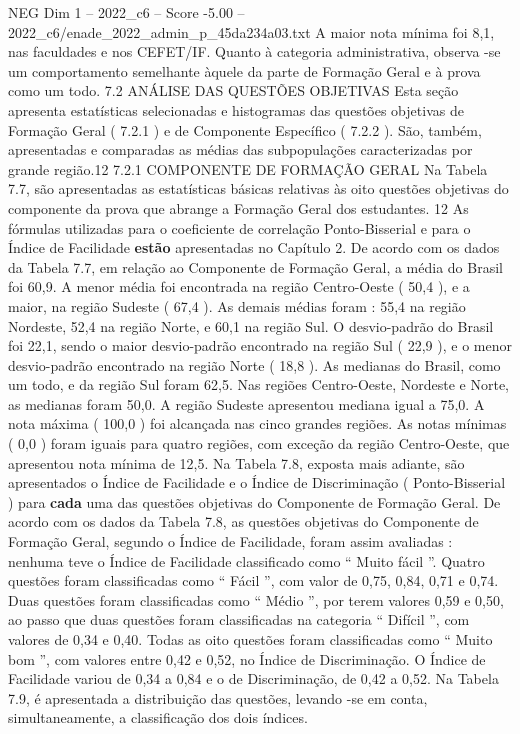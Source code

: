\begin{textsample}{NEG Dim 1 – 2022\_c6 – Score -5.00 – 2022\_c6/enade\_2022\_admin\_p\_45da234a03.txt}
A maior nota mínima foi 8,1, nas faculdades e nos CEFET/IF.
Quanto à categoria administrativa, observa -se um comportamento semelhante àquele da parte de Formação Geral e à prova como um todo. 7.2 ANÁLISE DAS QUESTÕES OBJETIVAS Esta seção apresenta estatísticas selecionadas e histogramas das questões objetivas de Formação Geral ( 7.2.1 ) e de Componente Específico ( 7.2.2 ).
São, também, apresentadas e comparadas as médias das subpopulações caracterizadas por grande região.12 7.2.1 COMPONENTE DE FORMAÇÃO GERAL Na Tabela 7.7, são apresentadas as estatísticas básicas relativas às oito questões objetivas do componente da prova que abrange a Formação Geral dos estudantes. 12 As fórmulas utilizadas para o coeficiente de correlação Ponto-Bisserial e para o Índice de Facilidade \textbf{estão} apresentadas no Capítulo 2.
De acordo com os dados da Tabela 7.7, em relação ao Componente de Formação Geral, a média do Brasil foi 60,9.
A menor média foi encontrada na região Centro-Oeste ( 50,4 ), e a maior, na região Sudeste ( 67,4 ).
As demais médias foram : 55,4 na região Nordeste, 52,4 na região Norte, e 60,1 na região Sul.
O desvio-padrão do Brasil foi 22,1, sendo o maior desvio-padrão encontrado na região Sul ( 22,9 ), e o menor desvio-padrão encontrado na região Norte ( 18,8 ).
As medianas do Brasil, como um todo, e da região Sul foram 62,5.
Nas regiões Centro-Oeste, Nordeste e Norte, as medianas foram 50,0.
A região Sudeste apresentou mediana igual a 75,0.
A nota máxima ( 100,0 ) foi alcançada nas cinco grandes regiões.
As notas mínimas ( 0,0 ) foram iguais para quatro regiões, com exceção da região Centro-Oeste, que apresentou nota mínima de 12,5.
Na Tabela 7.8, exposta mais adiante, são apresentados o Índice de Facilidade e o Índice de Discriminação ( Ponto-Bisserial ) para \textbf{cada} uma das questões objetivas do Componente de Formação Geral.
De acordo com os dados da Tabela 7.8, as questões objetivas do Componente de Formação Geral, segundo o Índice de Facilidade, foram assim avaliadas : nenhuma teve o Índice de Facilidade classificado como “ Muito fácil ”.
Quatro questões foram classificadas como “ Fácil ”, com valor de 0,75, 0,84, 0,71 e 0,74.
Duas questões foram classificadas como “ Médio ”, por terem valores 0,59 e 0,50, ao passo que duas questões foram classificadas na categoria “ Difícil ”, com valores de 0,34 e 0,40.
Todas as oito questões foram classificadas como “ Muito bom ”, com valores entre 0,42 e 0,52, no Índice de Discriminação.
O Índice de Facilidade variou de 0,34 a 0,84 e o de Discriminação, de 0,42 a 0,52.
Na Tabela 7.9, é apresentada a distribuição das questões, levando -se em conta, simultaneamente, a classificação dos dois índices.

\end{textsample}
